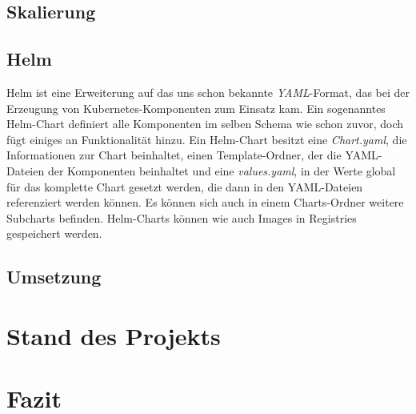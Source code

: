 \documentclass[12pt,a4paper]{scrartcl}
\begin{document}
\subsection{Skalierung} 



\subsection{Helm}

Helm ist eine Erweiterung auf das uns schon bekannte \emph{YAML}-Format, das bei der Erzeugung von Kubernetes-Komponenten zum Einsatz kam. Ein sogenanntes Helm-Chart definiert alle Komponenten im selben Schema wie schon zuvor, doch fügt einiges an Funktionalität hinzu. Ein Helm-Chart besitzt eine \emph{Chart.yaml}, die Informationen zur Chart beinhaltet, einen Template-Ordner, der die YAML-Dateien der Komponenten beinhaltet und eine \emph{values.yaml}, in der Werte global für das komplette Chart gesetzt werden, die dann in den YAML-Dateien referenziert werden können. Es können sich auch in einem Charts-Ordner weitere Subcharts befinden. Helm-Charts können wie auch Images in Registries gespeichert werden.

\subsection{Umsetzung}



\section{Stand des Projekts} \label{project_status}



\section{Fazit}\label{conclusion}

\newpage


\printbibliography
{}
\end{document}
